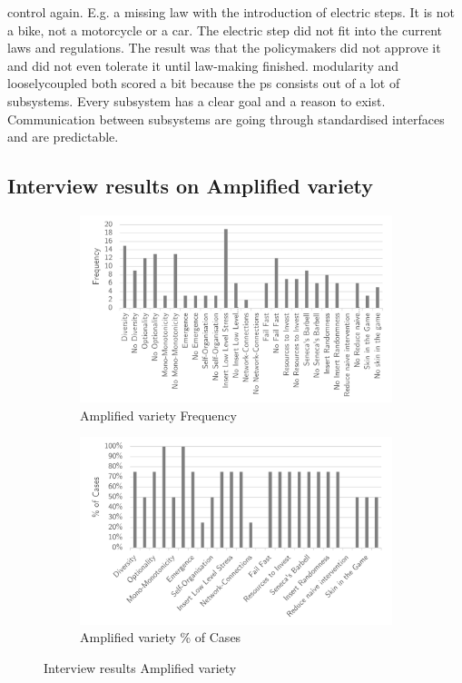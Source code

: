 control again. E.g. a missing law with the introduction of electric steps. It is not a bike, not a motorcycle or a car. The electric step did not fit into the current laws and regulations. The result was that the policymakers did not approve it and did not even tolerate it until law-making finished. \Gls{modularity} and \gls{looselycoupled} both scored a bit because the \gls{ps} consists out of a lot of subsystems. Every subsystem has a clear goal and a reason to exist. Communication between subsystems are going through standardised interfaces and are predictable.
\subsection{Interview results on Amplified variety}
\label{sub:interviewresultsaplified}
\begin{figure}[H]
	\centering
	\begin{subfigure}[H]{0.5\textwidth}
		\centering
		\includegraphics[width=0.95\linewidth]{images/amplified_frequency}
		\caption{Amplified variety Frequency}
		\label{fig:amplifiedfrequency}
	\end{subfigure}%
	\begin{subfigure}[H]{0.5\textwidth}
		\centering
		\includegraphics[width=0.95\linewidth]{images/amplified_cases}
		\caption{Amplified variety \% of Cases}
		\label{fig:amplifiedcases}
	\end{subfigure}
	\caption{Interview results Amplified variety}
	\label{fig:interviewamplifiedvariety}
\end{figure}

